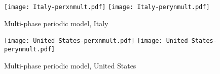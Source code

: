 \begin{figure}[H]
  \texttt{[image: Italy-perxnmult.pdf]} \label{fig:italy-perxnmult}
\endminipage\hfill
{}
  \texttt{[image: Italy-perynmult.pdf]} \label{fig:italy-perynmult}
\endminipage
\caption{Multi-phase periodic model, Italy}
\end{figure}

\begin{figure}[H]
  \texttt{[image: United States-perxnmult.pdf]} \label{fig:usa-perxnmult}
\endminipage\hfill
{}
  \texttt{[image: United States-perynmult.pdf]} \label{fig:usa-perynmult}
\endminipage
\caption{Multi-phase periodic model, United States}
\end{figure}
